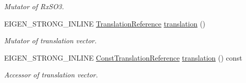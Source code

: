 \begin{DoxyCompactItemize}
\begin{DoxyCompactList}\small\item\em Mutator of Rx\+S\+O3. \end{DoxyCompactList}\item 
E\+I\+G\+E\+N\+\_\+\+S\+T\+R\+O\+N\+G\+\_\+\+I\+N\+L\+I\+NE \hyperlink{class_sophus_1_1_sim3_group_a56c24566b7aed53015817b59e86989ce}{Translation\+Reference} \hyperlink{class_sophus_1_1_sim3_group_ace8b98b369832930e647675b8c005d64}{translation} ()\hypertarget{class_sophus_1_1_sim3_group_ace8b98b369832930e647675b8c005d64}{}\label{class_sophus_1_1_sim3_group_ace8b98b369832930e647675b8c005d64}

\begin{DoxyCompactList}\small\item\em Mutator of translation vector. \end{DoxyCompactList}\item 
E\+I\+G\+E\+N\+\_\+\+S\+T\+R\+O\+N\+G\+\_\+\+I\+N\+L\+I\+NE \hyperlink{class_sophus_1_1_sim3_group_a11a3c75cf3bdad1f730722cf1767e012}{Const\+Translation\+Reference} \hyperlink{class_sophus_1_1_sim3_group_a7e82e871f647e2620020782e3b1ca503}{translation} () const \hypertarget{class_sophus_1_1_sim3_group_a7e82e871f647e2620020782e3b1ca503}{}\label{class_sophus_1_1_sim3_group_a7e82e871f647e2620020782e3b1ca503}

\begin{DoxyCompactList}\small\item\em Accessor of translation vector. \end{DoxyCompactList}\end{DoxyCompactItemize}
